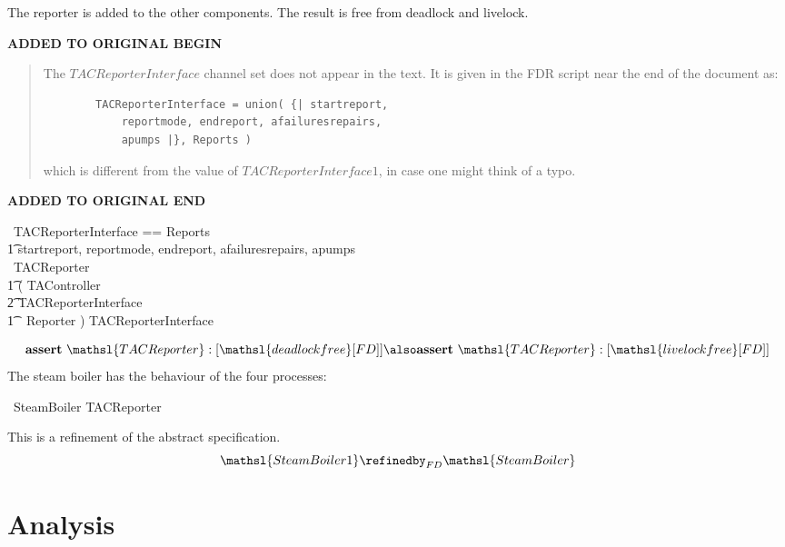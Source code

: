 \documentclass{report}
\newenvironment{addedstuff}{\begin{flushleft}\textbf{ADDED TO ORIGINAL BEGIN}\begin{quote}\begin{minipage}{.8\textwidth}}{\end{minipage}\end{quote}\textbf{ADDED TO ORIGINAL END}\end{flushleft}}
\begin{document}
The reporter is added to the other components.  The result is free
from deadlock and livelock.

\begin{addedstuff}
    The $TACReporterInterface$ channel set does not appear in the text.
    It is given in the FDR script near the end of the document as:
    \begin{verbatim}
        TACReporterInterface = union( {| startreport,
            reportmode, endreport, afailuresrepairs,
            apumps |}, Reports )
    \end{verbatim}
    which is different from the value of $TACReporterInterface1$, in case one might think of a typo.
\end{addedstuff}
%
\begin{circus}
   \circchannelset\ TACReporterInterface == Reports\ \cup \\
        \t1 \lchanset startreport, reportmode, endreport, afailuresrepairs, apumps \rchanset  \\
   \circprocess\ TACReporter \circdef \\
    \t1 ( TAController \\
        \t2 \lpar TACReporterInterface \rpar \\
        \t1\ \ Reporter ) \circhide TACReporterInterface
\end{circus}
\[
  \mathbf{assert}\ \mathsl{TACReporter} :[ \mathsl{deadlock free } [FD] ]
  \also %
  \mathbf{assert}\ \mathsl{TACReporter} :[ \mathsl{livelock free } [FD] ]
\]
The steam boiler has the behaviour of the four processes:
\begin{circus}
  \circprocess\ SteamBoiler \circdef TACReporter
\end{circus}
This is a refinement of the abstract specification.
\[
  \mathsl{SteamBoiler1} \refinedby_{FD} \mathsl{SteamBoiler}
\]


\chapter{Analysis}
\end{document}
